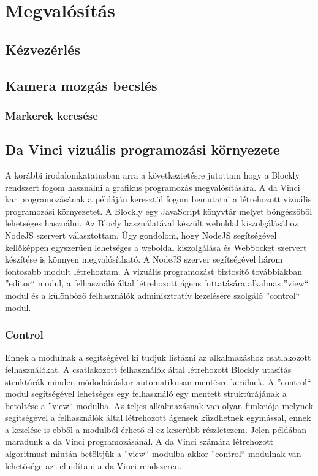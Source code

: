 \documentclass[12pt,a4paper,oneside]{report} %
\begin{document}
\chapter{Megvalósítás}
\section{Kézvezérlés}
\label{kezvez}
\section{Kamera mozgás becslés}
\subsection{Markerek keresése}

\section{Da Vinci vizuális programozási környezete}
A korábbi irodalomkatatusban arra a következtetésre jutottam hogy a Blockly rendszert fogom használni a  grafikus programozás megvalósítására.
A da Vinci kar programozásának a példáján keresztül fogom bemutatni a létrehozott vizuális programozási környezetet.
A Blockly egy JavaScript könyvtár melyet böngészőből lehetséges használni. Az Blocly használatával készült weboldal kiszolgálásához NodeJS szervert választottam. Úgy gondolom, hogy NodeJS segítségével kellőképpen egyszerűen lehetséges a weboldal kiszolgálása és WebSocket szervert készítése is könnyen megvalósítható. A NodeJS szerver segítségével három fontosabb modult létrehoztam. A vizuális programozást biztosító továbbiakban ''editor`` modul, a felhasználó által létrehozott ágens futtatására alkalmas ''view`` modul és a különböző felhasználók adminisztratív kezelésére szolgáló ''control`` modul.
\subsection{Control}
Ennek a modulnak a segítségével ki tudjuk listázni az alkalmazáshoz csatlakozott felhasználókat. A csatlakozott felhasználók által létrehozott Blockly utasítás struktúrák minden módodaíráskor automatikusan mentésre kerülnek. A ''control`` modul segítségével lehetséges egy felhasználó egy mentett struktúrájának a betöltése a  ''view`` modulba. Az teljes alkalmazásnak van olyan funkciója melynek segítségével a felhasználók által létrehozott ágensek küzdhetnek egymással, ennek a kezelése is ebből a modulból érhető el ez keserűbb részletezem. Jelen példában maradunk a da Vinci programozásánál. A da Vinci számára létrehozott algoritmust miután betöltjük a ''view`` modulba akkor ''control`` modulnak van lehetősége azt elindítani a da Vinci rendszeren. 
\end{document}
